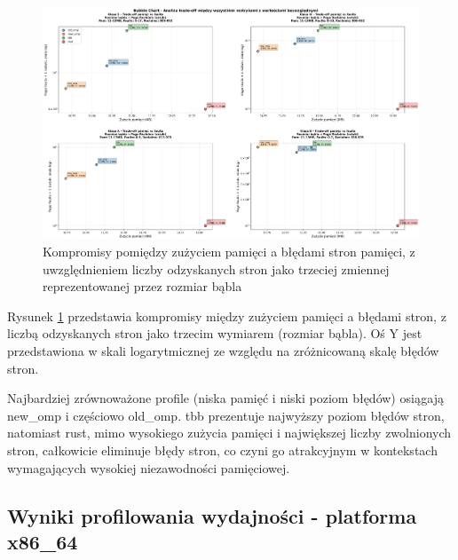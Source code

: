 \begin{figure}[H]
    \centering
    \includegraphics[width=\textwidth]{analiza/images/parallel/ep/chart_06_bubble_chart.png}
    \caption{Kompromisy  pomiędzy zużyciem pamięci a błędami stron pamięci, z uwzględnieniem liczby odzyskanych stron jako trzeciej zmiennej reprezentowanej przez rozmiar bąbla}
    \label{ep_kompromisy_pamiec_bledy}
\end{figure}
Rysunek \ref{ep_kompromisy_pamiec_bledy} przedstawia kompromisy między zużyciem pamięci a błędami stron, z liczbą odzyskanych stron jako trzecim wymiarem (rozmiar bąbla). Oś Y jest przedstawiona w skali logarytmicznej ze względu na zróżnicowaną skalę błędów stron.

Najbardziej zrównoważone profile (niska pamięć i niski poziom błędów) osiągają new\_omp i częściowo old\_omp. tbb prezentuje najwyższy poziom błędów stron, natomiast rust, mimo wysokiego zużycia pamięci i największej liczby zwolnionych stron, całkowicie eliminuje błędy stron, co czyni go atrakcyjnym w kontekstach wymagających wysokiej niezawodności pamięciowej.

\subsection{Wyniki profilowania wydajności - platforma x86\_64}